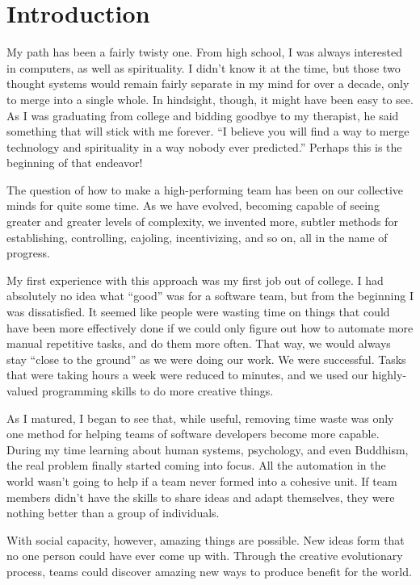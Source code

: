 \chapter{Introduction}

My path has been a fairly twisty one. From high school, I was always interested in computers, as well as
spirituality. I didn't know it at the time, but those two thought systems would remain fairly separate in my mind
for over a decade, only to merge into a single whole. In hindsight, though, it might have been easy to see. As I 
was graduating from college and bidding goodbye to my therapist, he said something that will stick with me 
forever. ``I believe you will find a way to merge technology and spirituality in a way nobody ever predicted.'' 
Perhaps this is the beginning of that endeavor!

The question of how to make a high-performing team has been on our collective minds for quite some time.
As we have evolved, becoming capable of seeing greater and greater levels of complexity, we invented
more, subtler methods for establishing, controlling, cajoling, incentivizing, and so on, all in the name of progress.

My first experience with this approach was my first job out of college. I had absolutely no idea what ``good''
was for a software team, but from the beginning I was dissatisfied. It seemed like people were wasting time on 
things that could have been more effectively done if we could only figure out how to automate more manual
repetitive tasks, and do them more often. That way, we would always stay ``close to the ground'' as we were
doing our work. We were successful. Tasks that were taking hours a week were reduced to minutes, and 
we used our highly-valued programming skills to do more creative things.

As I matured, I began to see that, while useful, removing time waste was only one method for helping
teams of software developers become more capable. During my time learning about human systems, 
psychology, and even Buddhism, the real problem finally started coming into focus. All the automation in
the world wasn't going to help if a team never formed into a cohesive unit. If team members didn't have the
skills to share ideas and adapt themselves, they were nothing better than a group of individuals. 

With social capacity, however, amazing things are possible. New ideas form that no one person could have
ever come up with. Through the creative evolutionary process, teams could discover amazing new ways
to produce benefit for the world.

